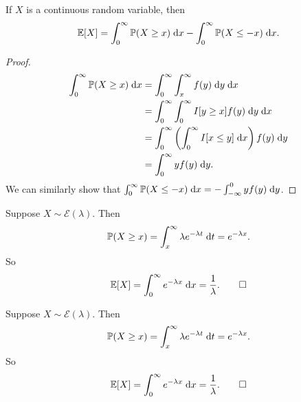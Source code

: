 %
\begin{note}
  \begin{field}
    \begin{thm}
      If $X$ is a continuous random variable, then
      \[
        \mathbb{E}[X] = \int_0^\infty \mathbb{P}(X \geq x)\;\mathrm{d} x - \int_0^\infty \mathbb{P}(X \leq -x)\;\mathrm{d} x.
      \]
    \end{thm}
  \end{field}
  \begin{field}
    \begin{proof}
      \begin{align*}
        \int_0^\infty \mathbb{P}(X \geq x)\;\mathrm{d} x &= \int_0^\infty \int_x^\infty f(y)\;\mathrm{d} y\;\mathrm{d} x\\
        &= \int_0^\infty \int_0^\infty I[y\geq x]f(y)\;\mathrm{d} y\;\mathrm{d} x\\
        &= \int_0^\infty \left(\int_0^\infty I[x\leq y]\;\mathrm{d} x\right) f(y)\;\mathrm{d} y\\
        &= \int_0^\infty yf(y)\;\mathrm{d} y.
      \end{align*}
      We can similarly show that $\int_0^\infty \mathbb{P}(X \leq -x)\;\mathrm{d} x = -\int_{-\infty}^0 yf(y)\;\mathrm{d} y$.
    \end{proof}
  \end{field}
  \xplain{}%
\end{note}

\begin{note}
  \begin{field}
    \begin{eg}
      Suppose $X\sim \mathcal{E}(\lambda)$. Then
      \[
        \mathbb{P}(X \geq x) = \int_x^{\infty} \lambda e^{-\lambda t}\;\mathrm{d} t = e^{-\lambda x}.
      \]
      So
      \[
        \mathbb{E}[X] = \int_0^\infty e^{-\lambda x}\;\mathrm{d} x = \frac{1}{\lambda}.\qedhere
      \]
    \end{eg}
  \end{field}
  \begin{field}
    \begin{eg}
      Suppose $X\sim \mathcal{E}(\lambda)$. Then
      \[
        \mathbb{P}(X \geq x) = \int_x^{\infty} \lambda e^{-\lambda t}\;\mathrm{d} t = e^{-\lambda x}.
      \]
      So
      \[
        \mathbb{E}[X] = \int_0^\infty e^{-\lambda x}\;\mathrm{d} x = \frac{1}{\lambda}.\qedhere
      \]
    \end{eg}
  \end{field}
  \xplain{}%
\end{note}


